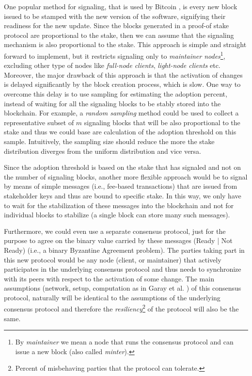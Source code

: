 One popular method for signaling, that is used by Bitcoin \cite{bitcoin}, is every new block issued to be stamped with the new version of the software, signifying their readiness for the new update. Since the blocks generated in a proof-of stake protocol are proportional to the stake, then we can assume that the signaling mechanism is also proportional to the stake. This approach is simple and straight forward to implement, but it restricts signaling only to \emph{maintainer nodes}\footnote{By \emph{maintainer} we mean a node that runs the consensus protocol and can issue a new block (also called \emph{minter}).}, excluding other type of nodes like \emph{full-node clients}, \emph{light-node clients} etc. Moreover, the major drawback of this approach is that the activation of changes is delayed significantly by the block creation process, which is slow.
 One way to overcome this delay is to use sampling for estimating the adoption percent, instead of waiting for all the signaling blocks to be stably stored into the blockchain. For example, a \emph{random sampling} method could be used to collect a representative subset of $m$ signaling blocks that will be also proportional to the stake and thus we could base are calculation of the adoption threshold on this sample. Intuitively, the sampling size should reduce the more the stake distribution diverges from the uniform distribution and vice versa.

Since the adoption threshold is based on the stake that has signaled and not on the number of signaling blocks, another more flexible approach would be to signal by means of simple messages (i.e., fee-based transactions) that are issued from stakeholder keys and thus are bound to specific stake. In this way, we only have to wait for the stabilization of these messages into the blockchain and not for individual blocks to stabilize (a single block can store many such messages).

Furthermore, we could even use a separate consensus protocol, just for the purpose to agree on the binary value carried by these messages (Ready | Not Ready) (i.e., a binary Byzantine Agreement problem). The parties taking part in this new protocol would be any node (client, or maintainer) that actively participates in the underlying consensus protocol and thus needs to synchronize with its peers with respect to the activation of some change. The main assumptions (network, setup, computation as in Garay et al. \cite{sok}) of this consensus protocol, naturally will be identical to the assumptions of the underlying consensus protocol and therefore the \emph{resiliency}\footnote{Percent of misbehaving parties that the protocol can tolerate.} of the protocol will also be the same. 

